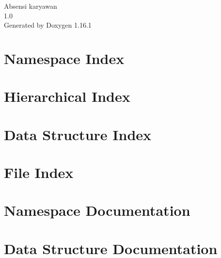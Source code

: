 \documentclass[twoside]{book}
\newcommand{\+}{\discretionary{\mbox{\scriptsize$\hookleftarrow$}}{}{}}
\newcommand{\clearemptydoublepage}{%
    \newpage{\pagestyle{empty}\cleardoublepage}%
  }
\begin{document}
  \raggedbottom
    \hypersetup{pageanchor=false,
                bookmarksnumbered=true,
                pdfencoding=unicode
               }
  \begin{titlepage}
  \vspace*{7cm}
  \begin{center}%
  {\Large Absensi karyawan}\\
  [1ex]\large 1.\+0 \\
  \vspace*{1cm}
  {\large Generated by Doxygen 1.16.1}\\
  \end{center}
  \end{titlepage}
  \clearemptydoublepage
  \tableofcontents
  \clearemptydoublepage
  \hypersetup{pageanchor=true}
\chapter{Namespace Index}

\chapter{Hierarchical Index}

\chapter{Data Structure Index}

\chapter{File Index}

\chapter{Namespace Documentation}

\chapter{Data Structure Documentation}












\end{document}
